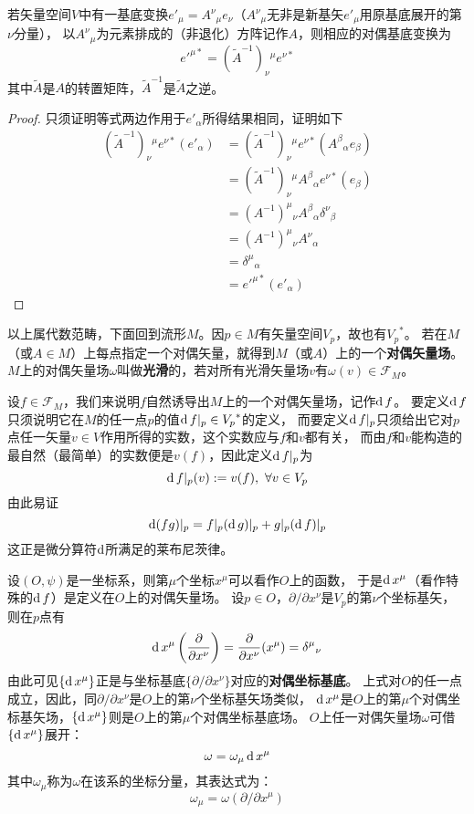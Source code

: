 \begin{theorem}
若矢量空间$V$中有一基底变换$e'_\mu = A^\nu{}_\mu e_\nu$（$A^\nu{}_\mu$无非是新基矢$e'_\mu$用原基底展开的第$\nu$分量），
以$A^\nu{}_\mu$为元素排成的（非退化）方阵记作$A$，则相应的对偶基底变换为
$$e'^{\mu*} = (\tilde{A}^{-1})_\nu{}^\mu e^{\nu*}$$
其中$\tilde{A}$是$A$的转置矩阵，$\tilde{A}^{-1}$是$\tilde{A}$之逆。
\end{theorem}

\begin{proof}
只须证明等式两边作用于$e'_\alpha$所得结果相同，证明如下
$$\begin{aligned}
(\tilde{A}^{-1})_\nu{}^\mu e^{\nu*}(e'_\alpha) & = (\tilde{A}^{-1})_\nu{}^\mu e^{\nu*}(A^\beta{}_\alpha e_\beta) \\
& = (\tilde{A}^{-1})_\nu{}^\mu A^\beta{}_\alpha e^{\nu*}(e_\beta) \\
& = (A^{-1})^\mu{}_\nu A^\beta{}_\alpha \delta^{\nu}{}_\beta \\
& = (A^{-1})^\mu{}_\nu A^\nu{}_\alpha \\
& = \delta^\mu{}_\alpha \\
& = e'^{\mu*}(e'_\alpha)
\end{aligned}$$
\end{proof}

以上属代数范畴，下面回到流形$M$。因$p \in M$有矢量空间$V_p$，故也有${V_p}^*$。
若在$M$（或$A \in M$）上每点指定一个对偶矢量，就得到$M$（或$A$）上的一个\textbf{对偶矢量场}。
$M$上的对偶矢量场$\omega$叫做\textbf{光滑}的，若对所有光滑矢量场$v$有$\omega(v) \in \mathscr{F}_M$。

设$f \in \mathscr{F}_M$，我们来说明$f$自然诱导出$M$上的一个对偶矢量场，记作$\operatorname{d} f$。
要定义$\operatorname{d} f$只须说明它在$M$的任一点$p$的值$\operatorname{d} f|_p \in {V_p}^*$的定义，
而要定义$\operatorname{d} f|_p$只须给出它对$p$点任一矢量$v \in V$作用所得的实数，这个实数应与$f$和$v$都有关，
而由$f$和$v$能构造的最自然（最简单）的实数便是$v(f)$，因此定义$\operatorname{d} f|_p$为
$$\operatorname{d} f|_p(v) := v(f), ~ \forall v \in V_p$$
由此易证
$$\operatorname{d} (fg)|_p = f|_p(\operatorname{d} g)|_p + g|_p(\operatorname{d} f)|_p$$
这正是微分算符$\operatorname{d}$所满足的莱布尼茨律。

设$(O, \psi)$是一坐标系，则第$\mu$个坐标$x^\mu$可以看作$O$上的函数，
于是$\operatorname{d} x^\mu$（看作特殊的$\operatorname{d} f$）是定义在$O$上的对偶矢量场。
设$p \in O$，$\partial / \partial x^\nu$是$V_p$的第$\nu$个坐标基矢，
则在$p$点有$$\operatorname{d} x^\mu\left(\frac{\partial}{\partial x^\nu}\right) = \frac{\partial}{\partial x^\nu}(x^\mu) = \delta^\mu{}_\nu$$
由此可见$\{\operatorname{d} x^\mu\}$正是与坐标基底$\{\partial / \partial x^\nu\}$对应的\textbf{对偶坐标基底}。
上式对$O$的任一点成立，因此，同$\partial / \partial x^\nu$是$O$上的第$\nu$个坐标基矢场类似，
$\operatorname{d} x^\mu$是$O$上的第$\mu$个对偶坐标基矢场，$\{\operatorname{d} x^\mu\}$则是$O$上的第$\mu$个对偶坐标基底场。
$O$上任一对偶矢量场$\omega$可借$\{\operatorname{d} x^\mu\}$展开：$$\omega = \omega_\mu\operatorname{d} x^\mu$$
其中$\omega_\mu$称为$\omega$在该系的坐标分量，其表达式为：$$\omega_\mu = \omega(\partial / \partial x^\mu)$$


